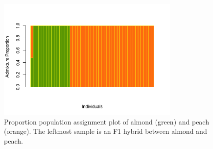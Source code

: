 \documentclass[12pt]{article}
\newcommand{\beginsupplement}{%
        \setcounter{table}{0}
        \renewcommand{\thetable}{S\arabic{table}}%
        \setcounter{figure}{0}
        \renewcommand{\thefigure}{S\arabic{figure}}%
     }
\begin{document}
%
\begin{figure}[b]
\centering
   \includegraphics[width=0.8\textwidth]{Admixture_test.png}
  \caption{Proportion population assignment plot of almond (green) and peach (orange). The leftmost sample is an F1 hybrid between almond and peach.}
  \label{fig:admix}
\end{figure}
%
\pagebreak
\beginsupplement
\end{document}
